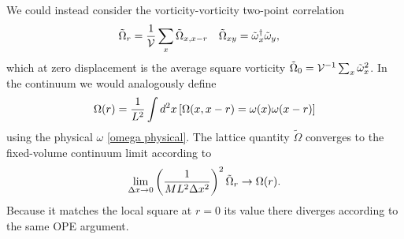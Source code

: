 We could instead consider the vorticity-vorticity two-point correlation
\begin{align}
	\tilde{\Omega}_{r} &= \frac{1}{\mathcal{V}} \sum_x \tilde{\Omega}_{x,x-r}
	&
	\tilde{\Omega}_{xy} &= \tilde{\omega}{}^{\dagger}_x \tilde{\omega}_y,
\end{align}
which at zero displacement is the average square vorticity $\tilde{\Omega}_0 = \mathcal{V}^{-1} \sum_x \tilde{\omega}^2_x$.
In the continuum we would analogously define
\begin{align}
	\Omega(r) = \frac{1}{L^2} \int d^2x \left[\Omega(x,x-r) = \omega(x) \omega(x-r) \right]
\end{align}
using the physical $\omega$ \eqref{omega physical}.
The lattice quantity $\tilde{\Omega}$ converges to the fixed-volume continuum limit according to
\begin{align}
	\lim_{\Delta x \rightarrow 0} \left(\frac{1}{ML^2 \Delta x^2}\right)^2 \tilde{\Omega}_r \rightarrow \Omega(r).
\end{align}
Because it matches the local square at $r=0$ its value there diverges according to the same OPE argument.

